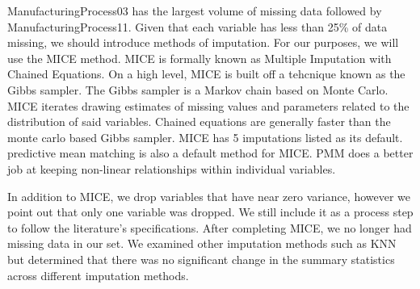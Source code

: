\documentclass[]{report}
\begin{document}
ManufacturingProcess03 has the largest volume of missing data followed
by ManufacturingProcess11. Given that each variable has less than 25\%
of data missing, we should introduce methods of imputation. For our
purposes, we will use the MICE method. MICE is formally known as
Multiple Imputation with Chained Equations. On a high level, MICE is
built off a tehcnique known as the Gibbs sampler. The Gibbs sampler is a
Markov chain based on Monte Carlo. MICE iterates drawing estimates of
missing values and parameters related to the distribution of said
variables. Chained equations are generally faster than the monte carlo
based Gibbs sampler. MICE has 5 imputations listed as its default.
predictive mean matching is also a default method for MICE. PMM does a
better job at keeping non-linear relationships within individual
variables.

In addition to MICE, we drop variables that have near zero variance,
however we point out that only one variable was dropped. We still
include it as a process step to follow the literature's specifications.
After completing MICE, we no longer had missing data in our set. We
examined other imputation methods such as KNN but determined that there
was no significant change in the summary statistics across different
imputation methods.
\end{document}
